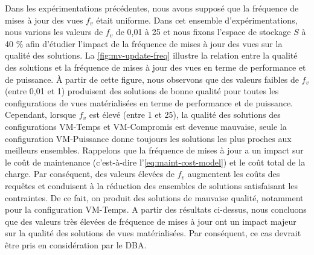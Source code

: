 Dans les expérimentations précédentes, nous avons supposé que la fréquence de mises à jour des vues $f_v$ était uniforme. Dans cet ensemble d'expérimentations, nous varions les valeurs de $f_v$ de 0,01 à 25 et nous fixons l'espace de stockage $S$ à 40 \% afin d'étudier l'impact de la fréquence de mises à jour des vues sur la qualité des solutions. La \ref{fig:mv-update-freq} illustre la relation entre la qualité des solutions et la fréquence de mises à jour des vues en terme de performance et de puissance. À partir de cette figure, nous observons que des valeurs faibles de $f_v$ (entre 0,01 et 1) produisent des solutions de bonne qualité pour toutes les configurations de vues matérialisées en terme de performance et de puissance. Cependant, lorsque $f_v$ est élevé (entre 1 et 25), la qualité des solutions des configurations VM-Temps et VM-Compromis est devenue mauvaise, seule la configuration VM-Puissance donne toujours les solutions les plus proches aux meilleurs ensembles. Rappelons que la fréquence de mises à jour a un impact sur le coût de maintenance (c'est-à-dire l'\ref{eq:maint-cost-model}) et le coût total de la charge. Par conséquent, des valeurs élevées de $f_v$ augmentent les coûts des requêtes et conduisent à la réduction des ensembles de solutions satisfaisant les contraintes. De ce fait, on produit des solutions de mauvaise qualité, notamment pour la configuration VM-Temps. A partir des résultats ci-dessus, nous concluons que des valeurs très élevées de fréquence de mises à jour ont un impact majeur sur la qualité des solutions de vues matérialisées. Par conséquent, ce cas devrait être pris en considération par le DBA.

